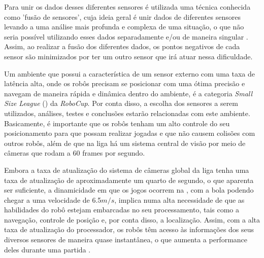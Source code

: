 \documentclass[acronym, symbols, table]{fei}
\begin{document}
	Para unir os dados desses diferentes sensores é utilizada uma técnica conhecida como 'fusão de sensores', cuja ideia geral é unir dados de diferentes sensores levando a uma análise mais profunda e complexa de uma situação, o que não seria possível utilizando esses dados separadamente e/ou de maneira singular \cite{s16101569}. Assim, ao realizar a fusão dos diferentes dados, os pontos negativos de cada sensor são minimizados por ter um outro sensor que irá atuar nessa dificuldade.
	
	Um ambiente que possui a característica de um sensor externo com uma taxa de latência alta, onde os robôs precisam se posicionar com uma ótima precisão e navegam de maneira rápida e dinâmica dentro do ambiente, é a categoria \textit{Small Size League} () da \textit{RoboCup}. Por conta disso, a escolha dos sensores a serem utilizados, análises, testes e conclusões estarão relacionadas com este ambiente. Basicamente, é importante que os robôs tenham um alto controle do seu posicionamento para que possam realizar jogadas e que não causem colisões com outros robôs, além de que na liga há um sistema central de visão por meio de câmeras que rodam a 60 frames por segundo.
	
	Embora a taxa de atualização do sistema de câmeras global da liga tenha uma taxa de atualização de aproximadamente um quarto de segundo, o que aparenta ser suficiente, a dinamicidade em que os jogos ocorrem na , com a bola podendo chegar a uma velocidade de 6.5$m/s$, implica numa alta necessidade de que as habilidades do robô estejam embarcadas no seu processamento, tais como a navegação, controle de posição e, por conta disso, a localização. Assim, com a alta taxa de atualização do processador, os robôs têm acesso às informações dos seus diversos sensores de maneira quase instantânea, o que aumenta a performance deles durante uma partida \cite{ubc_thunderbots_2015}.

%	
	
\end{document}
